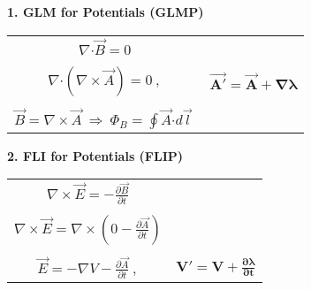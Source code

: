 \documentclass[12pt]{article}
\newcommand*{\dotP}{\boldsymbol \cdot}		%
\begin{document}
\vspace{10pt}
\begin{minipage}[t]{0.48\textwidth}
	\textbf{1. GLM for Potentials (GLMP)}
	\begin{center}
	\begin{tabular}{c c}
		\( \nabla \dotP \vec{B} = 0 \) & \\ \\
		\( \nabla \dotP ( \nabla \times \vec{A} ) = 0 \ , \) & \( \boldsymbol{ \vec{A'} = \vec{A} + \nabla \lambda } \)\\ \\
		\( \boxed{ \vec{B} = \nabla \times \vec{A}
			\ \Rightarrow \ \Phi_B = \oint \vec{A} \dotP d\vec{l} \ } \) & 
	\end{tabular}
	\end{center}
\end{minipage} 
\hspace{0\textwidth}
\begin{minipage}[t]{0.48\textwidth}
	\textbf{2. FLI for Potentials (FLIP)}
	\begin{center}
	\begin{tabular}{c c}
		\( \nabla \times \vec{E} = - \frac{\partial \vec{B}}{\partial t} \) & \\ \\
		\( \nabla \times \vec{E} = \nabla \times \left ( 0 - \frac{\partial \vec{A}}{\partial t} \right ) \) & \\ \\
		\( \boxed{ \vec{E} = - \nabla V - \frac{\partial \vec{A}}{\partial t} } \ , \) & 
			\( \boldsymbol{ V' = V + \frac{\partial \lambda}{\partial t} } \) 
	\end{tabular}
	\end{center}
\end{minipage} 
\end{document}
